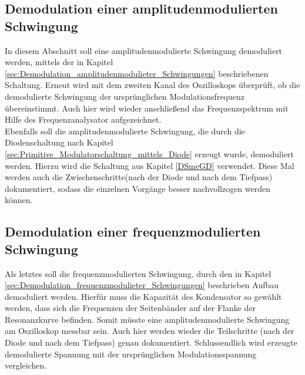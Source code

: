 \subsection{Demodulation einer amplitudenmodulierten Schwingung}
In diesem Abschnitt soll eine amplitudenmodulierte Schwingung demoduliert werden, mittels der in Kapitel \ref{sec:Demodulation_amplitudenmodulieter_Schwingungen} beschriebenen Schaltung. Erneut wird mit dem zweiten Kanal des Oszilloskops überprüft, ob die demodulierte Schwingung der ursprünglichen Modulationsfrequenz übereinstimmt. Auch hier wird wieder anschließend das Frequenzspektrum mit Hilfe des Frequenzanalysator aufgezeichnet.
\\
Ebenfalls soll die amplitudenmodulierte Schwingung, die durch die Diodenschaltung nach Kapitel \ref{sec:Primitive_Modulatorschaltung_mittels_Diode} erzeugt wurde, demoduliert werden. Hierzu wird die Schaltung aus Kapitel \ref{DSmeGD} verwendet. Diese Mal werden auch die Zwischenschritte(nach der Diode und nach dem Tiefpass) dokumentiert, sodass die einzelnen Vorgänge besser nachvollzogen werden können.

\subsection{Demodulation einer frequenzmodulierten Schwingung}
Als letztes soll die frequenzmodulierten Schwingung, durch den in Kapitel \ref{sec:Demodulation_frequenzmodulieter_Schwingungen} beschrieben Aufbau demoduliert werden. Hierfür muss die Kapazität des Kondensator so gewählt werden, dass sich die Frequenzen der Seitenbänder auf der Flanke der Resonanzkurve befinden. Somit müsste eine amplitudenmodulierte Schwingung am Oszilloskop messbar sein. Auch hier werden wieder die Teilschritte (nach der Diode und nach dem Tiefpass) genau dokumentiert. Schlussendlich wird erzeugte demodulierte Spannung mit der ursprünglichen Modulationsspannung vergleichen. 
